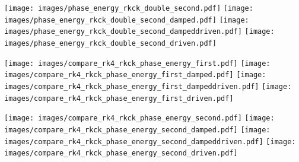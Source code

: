 \begin{multicols}{4}

{\centering\texttt{[image: images/phase\_energy\_rkck\_double\_second.pdf]}}
\label{fig:76}
\hfill
{\centering\texttt{[image: images/phase\_energy\_rkck\_double\_second\_damped.pdf]}}
\label{fig:77}
\hfill
{\centering\texttt{[image: images/phase\_energy\_rkck\_double\_second\_dampeddriven.pdf]}}
\label{fig:78}
\hfill
{\centering\texttt{[image: images/phase\_energy\_rkck\_double\_second\_driven.pdf]}}
\label{fig:79}
\hfill

\end{multicols}

\newpage

\begin{multicols}{4}

{\centering\texttt{[image: images/compare\_rk4\_rkck\_phase\_energy\_first.pdf]}}
\label{fig:80}
\hfill
{\centering\texttt{[image: images/compare\_rk4\_rkck\_phase\_energy\_first\_damped.pdf]}}
\label{fig:81}
\hfill
{\centering\texttt{[image: images/compare\_rk4\_rkck\_phase\_energy\_first\_dampeddriven.pdf]}}
\label{fig:82}
\hfill
{\centering\texttt{[image: images/compare\_rk4\_rkck\_phase\_energy\_first\_driven.pdf]}}
\label{fig:83}
\hfill

\end{multicols}
\begin{multicols}{4}

{\centering\texttt{[image: images/compare\_rk4\_rkck\_phase\_energy\_second.pdf]}}
\label{fig:84}
\hfill
{\centering\texttt{[image: images/compare\_rk4\_rkck\_phase\_energy\_second\_damped.pdf]}}
\label{fig:85}
\hfill
{\centering\texttt{[image: images/compare\_rk4\_rkck\_phase\_energy\_second\_dampeddriven.pdf]}}
\label{fig:86}
\hfill
{\centering\texttt{[image: images/compare\_rk4\_rkck\_phase\_energy\_second\_driven.pdf]}}
\label{fig:87}
\hfill

\end{multicols}

